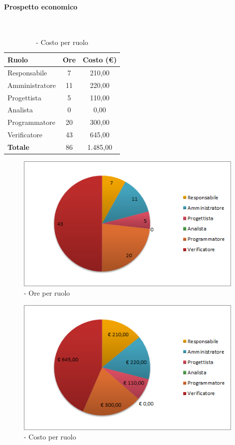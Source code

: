 \documentclass[./PianoDiProgetto.tex]{subfiles}
\begin{document}
\vspace{35 mm}
	\paragraph{Prospetto economico}\

	\begin{table}[H]
		\centering

		\begin{tabular}{l * {2}{c}}
			\toprule
			\textbf{Ruolo} & \textbf{Ore} & \textbf{Costo (\euro{})} \\
			\midrule
			Responsabile & 7 & 210,00 \\
			Amministratore  & 11 & 220,00 \\
			Progettista  & 5 & 110,00 \\
			Analista & 0 & 0,00 \\
			Programmatore  & 20 &  300,00 \\
			Verificatore  & 43 &  645,00 \\
			\midrule
			\textbf{Totale}  & 86   &  1.485,00 \\
			\bottomrule
		\end{tabular}
		\caption{\PerV{} - Costo per ruolo}
	\end{table}
\vfill

	\begin{figure}[H]
		\centering
		\includegraphics[width=11cm, trim=1cm 0cm 1cm 0cm]{grafici/V-ruolo}
			\caption{\PerV{} - Ore per ruolo}
	\end{figure}
\vfill

	\begin{figure}[H]
		\centering
		\includegraphics[width=11cm, trim=1cm 0cm 1cm 0cm]{grafici/V-costo}
			\caption{\PerV{} - Costo per ruolo}
	\end{figure}
\end{document}
